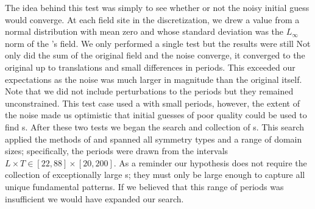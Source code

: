 The idea behind this test was simply to see whether or not
the noisy initial guess would converge.
At each field site in the discretization, we drew a value from a
normal distribution with mean zero and whose standard deviation was the
$L_{\infty}$ norm of the {\po}'s field. We only performed a single test
but the results were still  Not only did the
sum of the original field and the noise converge, it converged to the original {\po}
up to translations and small differences in periods.
This exceeded our expectations as the noise was much larger in magnitude
than the original {\po} itself.
Note that we did not include perturbations to the periods but
they remained unconstrained. This test case used a {\po}
with small periods, however, the extent of the noise made us
optimistic that initial guesses of poor quality could be used to find {\po}s.
After these two tests we began the search and collection of {\po}s.
This search applied the methods of  and
spanned all symmetry types and a range of domain sizes; specifically,
the periods were drawn from the intervals
$L \times T \in [22, 88] \times [20, 200]$.
As a reminder our hypothesis does not require the collection of exceptionally large {\po}s;
they must only be large enough to capture all unique fundamental patterns. If we believed
that this range of periods was insufficient we would have expanded our
search.


